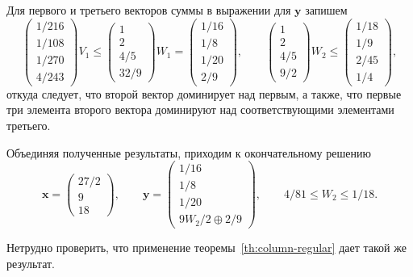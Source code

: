 \documentclass[specialist,
               substylefile = spbu.rtx,
               subf,href,colorlinks=true, 12pt]{disser}
\theoremstyle{definition}
\begin{document}
Для первого и третьего векторов суммы в выражении для $\bm{y}$ запишем
\begin{equation*}
\begin{pmatrix}
 1/216
\\
 1/108
\\
 1/270
\\
 4/243
\end{pmatrix} 
V_{1}
\leq
\begin{pmatrix}
 1
\\
 2
\\
 4/5
\\
 32/9
\end{pmatrix}
W_{1}
=
\begin{pmatrix}
 1/16
\\
 1/8
\\
 1/20
\\
 2/9
\end{pmatrix},
\qquad
\begin{pmatrix}
 1
\\
 2
\\
 4/5
\\
 9/2
\end{pmatrix}
 W_{2}
\leq
\begin{pmatrix}
 1/18
\\
 1/9
\\
 2/45
\\
 1/4
\end{pmatrix},
\end{equation*}
откуда следует, что второй вектор доминирует над первым, а также, что первые три элемента второго вектора доминируют над соответствующими элементами третьего.

Объединяя полученные результаты, приходим к окончательному решению
\begin{equation*}
\bm{x}
=
\begin{pmatrix}
 27/2
\\
 9
\\
 18
\end{pmatrix},
\qquad
\bm{y}
=
\begin{pmatrix}
 1/16
\\
 1/8
\\
 1/20
\\
 9W_{2}/2\oplus2/9
\end{pmatrix},
\qquad
4/81
\leq
W_{2}
\leq
1/18.
\end{equation*}

Нетрудно проверить, что применение теоремы~\ref{th:column-regular} дает такой же результат.
\end{document}
